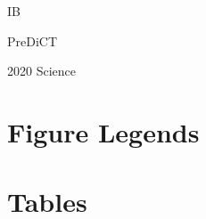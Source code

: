 \documentclass[10pt]{article}
\begin{document}
IB

PreDiCT

2020 Science



\section*{Figure Legends}


\section*{Tables}
\end{document}
